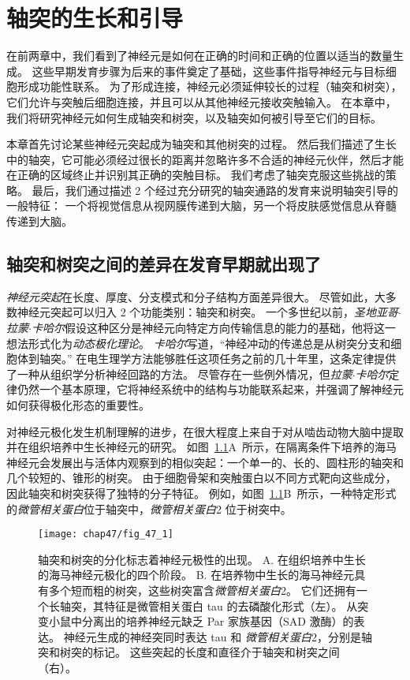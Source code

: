 \chapter{轴突的生长和引导} \label{chap:chap47}


在前两章中，我们看到了神经元是如何在正确的时间和正确的位置以适当的数量生成。
这些早期发育步骤为后来的事件奠定了基础，这些事件指导神经元与目标细胞形成功能性联系。
为了形成连接，神经元必须延伸较长的过程（轴突和树突），它们允许与突触后细胞连接，并且可以从其他神经元接收突触输入。
在本章中，我们将研究神经元如何生成轴突和树突，以及轴突如何被引导至它们的目标。


本章首先讨论某些神经元突起成为轴突和其他树突的过程。
然后我们描述了生长中的轴突，它可能必须经过很长的距离并忽略许多不合适的神经元伙伴，然后才能在正确的区域终止并识别其正确的突触目标。
我们考虑了轴突克服这些挑战的策略。
最后，我们通过描述 2 个经过充分研究的轴突通路的发育来说明轴突引导的一般特征：
一个将视觉信息从视网膜传递到大脑，另一个将皮肤感觉信息从脊髓传递到大脑。



\section{轴突和树突之间的差异在发育早期就出现了}

\textit{神经元突起}在长度、厚度、分支模式和分子结构方面差异很大。
尽管如此，大多数神经元突起可以归入 2 个功能类别：轴突和树突。
一个多世纪以前，\textit{圣地亚哥$\cdot$拉蒙$\cdot$卡哈尔}假设这种区分是神经元向特定方向传输信息的能力的基础，他将这一想法形式化为\textit{动态极化理论}。
\textit{卡哈尔}写道，“神经冲动的传递总是从树突分支和细胞体到轴突。” 
在电生理学方法能够胜任这项任务之前的几十年里，这条定律提供了一种从组织学分析神经回路的方法。
尽管存在一些例外情况，但\textit{拉蒙$\cdot$卡哈尔}定律仍然一个基本原理，它将神经系统中的结构与功能联系起来，并强调了解神经元如何获得极化形态的重要性。


对神经元极化发生机制理解的进步，在很大程度上来自于对从啮齿动物大脑中提取并在组织培养中生长神经元的研究。
如图~\ref{fig:47_1}A~所示，在隔离条件下培养的海马神经元会发展出与活体内观察到的相似突起：一个单一的、长的、圆柱形的轴突和几个较短的、锥形的树突。
由于细胞骨架和突触蛋白以不同方式靶向这些成分，因此轴突和树突获得了独特的分子特征。
例如，如图~\ref{fig:47_1}B~所示，一种特定形式的\textit{微管相关蛋白}位于轴突中，\textit{微管相关蛋白}2 位于树突中。


\begin{figure}[htbp]
	\centering
	\texttt{[image: chap47/fig\_47\_1]}
	\caption{轴突和树突的分化标志着神经元极性的出现。
		A. 在组织培养中生长的海马神经元极化的四个阶段\cite{kaech2006culturing}。
		B. 在培养物中生长的海马神经元具有多个短而粗的树突，这些树突富含\textit{微管相关蛋白}2。
		它们还拥有一个长轴突，其特征是微管相关蛋白 tau 的去磷酸化形式（左）。
		从突变小鼠中分离出的培养神经元缺乏 Par 家族基因（SAD 激酶）的表达。
		神经元生成的神经突同时表达 tau 和 \textit{微管相关蛋白}2，分别是轴突和树突的标记。
		这些突起的长度和直径介于轴突和树突之间（右）\cite{kishi2005mammalian}。}
	\label{fig:47_1}
\end{figure}


